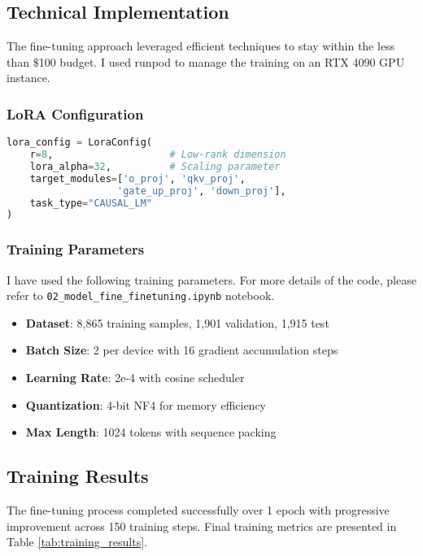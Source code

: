 \documentclass[11pt,letterpaper]{article}
\begin{document}
\subsection{Technical Implementation}
The fine-tuning approach leveraged efficient techniques to stay within the less than $\$$100 budget. I used runpod to manage the training on an RTX 4090 GPU instance.

\subsubsection{LoRA Configuration}
\begin{lstlisting}[language=Python]
lora_config = LoraConfig(
    r=8,                    # Low-rank dimension
    lora_alpha=32,          # Scaling parameter
    target_modules=['o_proj', 'qkv_proj',
                   'gate_up_proj', 'down_proj'],
    task_type="CAUSAL_LM"
)
\end{lstlisting}

\subsubsection{Training Parameters}
I have used the following training parameters. For more details of the code, please refer to \texttt{02\_model\_fine\_finetuning.ipynb} notebook.
\begin{itemize}
    \item \textbf{Dataset}: 8,865 training samples, 1,901 validation, 1,915 test
    \item \textbf{Batch Size}: 2 per device with 16 gradient accumulation steps
    \item \textbf{Learning Rate}: 2e-4 with cosine scheduler
    \item \textbf{Quantization}: 4-bit NF4 for memory efficiency
    \item \textbf{Max Length}: 1024 tokens with sequence packing
\end{itemize}

\subsection{Training Results}
The fine-tuning process completed successfully over 1 epoch with progressive improvement across 150 training steps. Final training metrics are presented in Table \ref{tab:training_results}.
\end{document}
